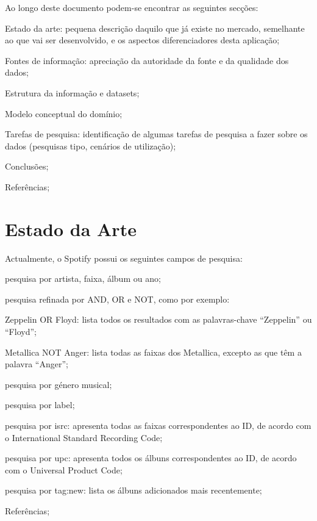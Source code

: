 \documentclass[twocolumn,twoside,11pt,a4paper]{article}
\begin{document}
Ao longo deste documento podem-se encontrar as seguintes secções:
\begin{compactitem}
  \item Estado da arte: pequena descrição daquilo que já existe no mercado, semelhante
    ao que vai ser desenvolvido, e os aspectos diferenciadores desta aplicação;
  \item Fontes de informação: apreciação da autoridade da fonte e da qualidade dos
    dados;
  \item Estrutura da informação e datasets;
  \item Modelo conceptual do domínio;
  \item Tarefas de pesquisa: identificação de algumas tarefas de pesquisa a fazer sobre
    os dados (pesquisas tipo, cenários de utilização);
  \item Conclusões;
  \item Referências;
\end{compactitem}


\section{Estado da Arte}\label{sec:art}

Actualmente, o Spotify possui os seguintes campos de pesquisa:
\begin{compactitem}
  \item pesquisa por artista, faixa, álbum ou ano;
  \item pesquisa refinada por AND, OR e NOT, como por exemplo:
    \begin{compactitem}
      \item Zeppelin OR Floyd: lista todos os resultados com as palavras-chave
        “Zeppelin” ou “Floyd”;
      \item Metallica NOT Anger: lista todas as faixas dos Metallica, excepto as que têm
        a palavra “Anger”;
    \end{compactitem}
  \item pesquisa por género musical;
  \item pesquisa por label;
  \item pesquisa por isrc: apresenta todas as faixas correspondentes ao ID, de acordo com
    o International Standard Recording Code;
  \item pesquisa por upc: apresenta todos os álbuns correspondentes ao ID, de acordo com
    o Universal Product Code;
  \item pesquisa por tag:new: lista os álbuns adicionados mais recentemente;
  \item Referências;
\end{compactitem}
\end{document}
